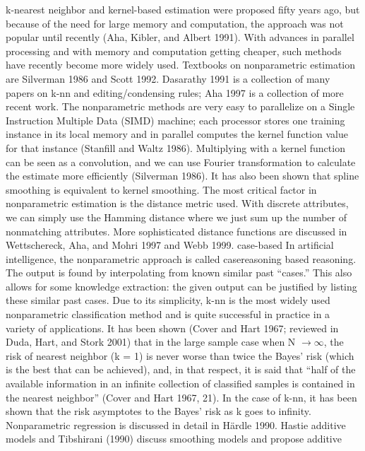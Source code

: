k-nearest neighbor and kernel-based estimation were proposed fifty years ago, but because of the need for large memory and computation, the approach was not popular until recently (Aha, Kibler, and Albert 1991). With advances in parallel processing and with memory and computation getting cheaper, such methods have recently become more widely used. Textbooks on nonparametric estimation are Silverman 1986 and Scott 1992. Dasarathy 1991 is a collection of many papers on k-nn and editing/condensing rules; Aha 1997 is a collection of more recent work. The nonparametric methods are very easy to parallelize on a Single Instruction Multiple Data (SIMD) machine; each processor stores one training instance in its local memory and in parallel computes the kernel function value for that instance (Stanfill and Waltz 1986). Multiplying with a kernel function can be seen as a convolution, and we can use Fourier transformation to calculate the estimate more efficiently (Silverman 1986). It has also been shown that spline smoothing is equivalent to kernel smoothing. The most critical factor in nonparametric estimation is the distance metric used. With discrete attributes, we can simply use the Hamming distance where we just sum up the number of nonmatching attributes. More sophisticated distance functions are discussed in Wettschereck, Aha, and Mohri 1997 and Webb 1999. case-based In artificial intelligence, the nonparametric approach is called casereasoning based reasoning. The output is found by interpolating from known similar past “cases.” This also allows for some knowledge extraction: the given output can be justified by listing these similar past cases. Due to its simplicity, k-nn is the most widely used nonparametric classification method and is quite successful in practice in a variety of applications. It has been shown (Cover and Hart 1967; reviewed in Duda, Hart, and Stork 2001) that in the large sample case when N $\to$$\infty$, the risk of nearest neighbor (k = 1) is never worse than twice the Bayes’ risk (which is the best that can be achieved), and, in that respect, it is said that “half of the available information in an infinite collection of classified samples is contained in the nearest neighbor” (Cover and Hart 1967, 21). In the case of k-nn, it has been shown that the risk asymptotes to the Bayes’ risk as k goes to infinity. Nonparametric regression is discussed in detail in Härdle 1990. Hastie additive models and Tibshirani (1990) discuss smoothing models and propose additive

